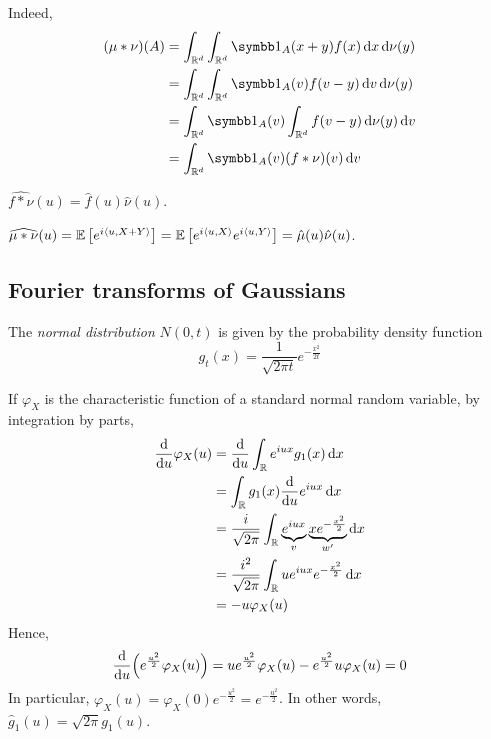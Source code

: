 Indeed,
\begin{align*}
	(\mu \ast \nu)(A) &= \int_{\mathbb R^d} \int_{\mathbb R^d} \symbb 1_A(x+y) f(x) \dd{x} \dd{\nu(y)} \\
	&= \int_{\mathbb R^d} \int_{\mathbb R^d} \symbb 1_A(v) f(v-y) \dd{v} \dd{\nu(y)} \\
	&= \int_{\mathbb R^d} \symbb 1_A(v) \int_{\mathbb R^d}f(v-y) \dd{\nu(y)} \dd{v} \\
	&= \int_{\mathbb R^d} \symbb 1_A(v) (f \ast \nu)(v) \dd{v}
\end{align*}
\begin{proposition}
	\( \widehat{f \ast \nu}(u) = \hat f(u) \hat \nu(u) \).
\end{proposition}
\begin{proposition}
	\( \widehat{\mu \ast \nu}(u) = \mathbb{E}\left[{e^{i\left\langle{u,X+Y}\right\rangle}}\right] = \mathbb{E}\left[{e^{i\left\langle{u,X}\right\rangle}e^{i\left\langle{u,Y}\right\rangle}}\right] = \hat \mu(u) \hat \nu(u) \).
\end{proposition}

\subsection{Fourier transforms of Gaussians}
\begin{definition}
	The \emph{normal distribution} \( N(0,t) \) is given by the probability density function
	\[ g_t(x) = \frac{1}{\sqrt{2\pi t}} e^{-\frac{x^2}{2t}} \]
\end{definition}
If \( \varphi_X \) is the characteristic function of a standard normal random variable, by integration by parts,
\begin{align*}
	\dv{u} \varphi_X(u) &= \dv{u} \int_{\mathbb R} e^{iux} g_1(x) \dd{x} \\
	&= \int_{\mathbb R} g_1(x) \dv{u} e^{iux} \dd{x} \\
	&= \frac{i}{\sqrt{2\pi}} \int_{\mathbb R} \underbrace{e^{iux}}_{v} \underbrace{x e^{-\frac{x^2}{2}}}_{w'} \dd{x} \\
	&= \frac{i^2}{\sqrt{2\pi}} \int_{\mathbb R} u e^{iux} e^{-\frac{x^2}{2}} \dd{x} \\
	&= -u \varphi_X(u)
\end{align*}
Hence,
\[ \dv{u}\qty(e^{\frac{u^2}{2}} \varphi_X(u)) = ue^{\frac{u^2}{2}} \varphi_X(u) - e^{\frac{u^2}{2}} u \varphi_X(u) = 0 \]
In particular, \( \varphi_X(u) = \varphi_X(0) e^{-\frac{u^2}{2}} = e^{-\frac{u^2}{2}} \).
In other words, \( \hat g_1(u) = \sqrt{2\pi} g_1(u) \).

